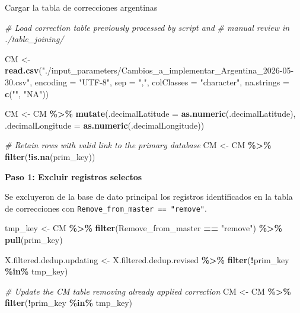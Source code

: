 \documentclass[sn-apa,pdflatex]{sn-jnl}
\newenvironment{Shaded}{\begin{snugshade}}{\end{snugshade}}
\newcommand{\AttributeTok}[1]{\textcolor[rgb]{0.13,0.29,0.53}{#1}}
\newcommand{\CommentTok}[1]{\textcolor[rgb]{0.56,0.35,0.01}{\textit{#1}}}
\newcommand{\FunctionTok}[1]{\textcolor[rgb]{0.13,0.29,0.53}{\textbf{#1}}}
\newcommand{\NormalTok}[1]{#1}
\newcommand{\OtherTok}[1]{\textcolor[rgb]{0.56,0.35,0.01}{#1}}
\newcommand{\SpecialCharTok}[1]{\textcolor[rgb]{0.81,0.36,0.00}{\textbf{#1}}}
\newcommand{\StringTok}[1]{\textcolor[rgb]{0.31,0.60,0.02}{#1}}
\begin{document}
Cargar la tabla de correcciones argentinas

\begin{Shaded}
\begin{Highlighting}[]
\CommentTok{\# Load correction table previously processed by script and}
\CommentTok{\# manual review in ./table\_joining/}

\NormalTok{CM }\OtherTok{\textless{}{-}} \FunctionTok{read.csv}\NormalTok{(}\StringTok{"./input\_parameters/Cambios\_a\_implementar\_Argentina\_2026{-}05{-}30.csv"}\NormalTok{,}
    \AttributeTok{encoding =} \StringTok{"UTF{-}8"}\NormalTok{, }\AttributeTok{sep =} \StringTok{","}\NormalTok{, }\AttributeTok{colClasses =} \StringTok{"character"}\NormalTok{,}
    \AttributeTok{na.strings =} \FunctionTok{c}\NormalTok{(}\StringTok{""}\NormalTok{, }\StringTok{"NA"}\NormalTok{))}

\NormalTok{CM }\OtherTok{\textless{}{-}}\NormalTok{ CM }\SpecialCharTok{\%\textgreater{}\%}
    \FunctionTok{mutate}\NormalTok{(}\AttributeTok{.decimalLatitude =} \FunctionTok{as.numeric}\NormalTok{(.decimalLatitude), }\AttributeTok{.decimalLongitude =} \FunctionTok{as.numeric}\NormalTok{(.decimalLongitude))}

\CommentTok{\# Retain rows with valid link to the primary database}
\NormalTok{CM }\OtherTok{\textless{}{-}}\NormalTok{ CM }\SpecialCharTok{\%\textgreater{}\%}
    \FunctionTok{filter}\NormalTok{(}\SpecialCharTok{!}\FunctionTok{is.na}\NormalTok{(prim\_key))}
\end{Highlighting}
\end{Shaded}

\textbf{Paso 1: Excluir registros selectos}

Se excluyeron de la base de dato principal los registros identificados
en la tabla de correcciones con
\texttt{Remove\_from\_master\ ==\ "remove"}.

\begin{Shaded}
\begin{Highlighting}[]
\NormalTok{tmp\_key }\OtherTok{\textless{}{-}}\NormalTok{ CM }\SpecialCharTok{\%\textgreater{}\%}
    \FunctionTok{filter}\NormalTok{(Remove\_from\_master }\SpecialCharTok{==} \StringTok{"remove"}\NormalTok{) }\SpecialCharTok{\%\textgreater{}\%}
    \FunctionTok{pull}\NormalTok{(prim\_key)}

\NormalTok{X.filtered.dedup.updating }\OtherTok{\textless{}{-}}\NormalTok{ X.filtered.dedup.revised }\SpecialCharTok{\%\textgreater{}\%}
    \FunctionTok{filter}\NormalTok{(}\SpecialCharTok{!}\NormalTok{prim\_key }\SpecialCharTok{\%in\%}\NormalTok{ tmp\_key)}

\CommentTok{\# Update the CM table removing already applied correction}
\NormalTok{CM }\OtherTok{\textless{}{-}}\NormalTok{ CM }\SpecialCharTok{\%\textgreater{}\%}
    \FunctionTok{filter}\NormalTok{(}\SpecialCharTok{!}\NormalTok{prim\_key }\SpecialCharTok{\%in\%}\NormalTok{ tmp\_key)}
\end{Highlighting}
\end{Shaded}
\end{document}
